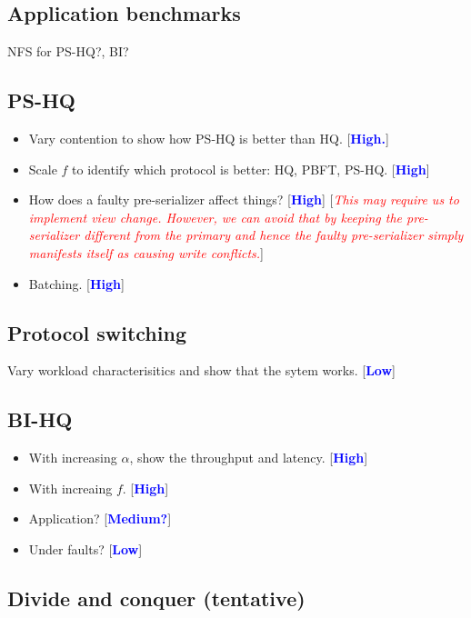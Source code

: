 \documentclass[twocolumn,10pt]{article}
\newcommand{\note}[1]{[\textcolor{red}{\textit{#1}}]}
\newcommand{\priority}[1]{[\textcolor{blue}{\textbf{#1}}]}
\begin{document}
\subsection{Application benchmarks}

NFS for PS-HQ?, BI?

\subsection{PS-HQ}

\begin{itemize}
\item{}Vary contention to show how PS-HQ is better than HQ. \priority{High.}

\item{}Scale $f$ to identify which protocol is better: HQ, PBFT, PS-HQ. \priority{High}

\item{} How does a faulty pre-serializer affect things? \priority{High} \note{This may require
us to implement view change. However, we can avoid that by keeping the pre-serializer
different from the primary and hence the faulty pre-serializer simply
manifests itself as causing write conflicts.}
\item{} Batching. \priority{High}
\end{itemize}

\subsection{Protocol switching}

Vary workload characterisitics and show that the sytem works. \priority{Low}

\subsection{BI-HQ}
\begin{itemize}
\item{} With increasing $\alpha$, show the throughput and latency. \priority{High}
\item{} With increaing $f$. \priority{High}
\item{} Application? \priority{Medium?}
\item{} Under faults? \priority{Low}
\end{itemize}

\subsection{Divide and conquer (tentative)}
\end{document}
